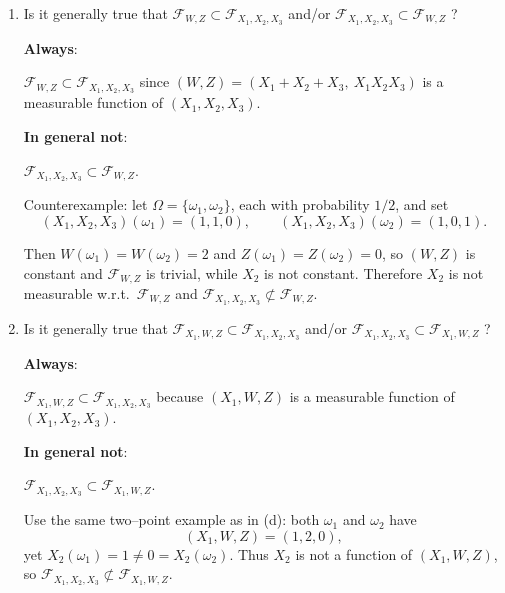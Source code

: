 \documentclass[dvipsnames,11pt]{article}
\begin{document}
\begin{enumerate}[label=\alph*.]
        \item Is it generally true that $\mathcal F_{W,Z}\subset \mathcal F_{X_1,X_2,X_3}$ and/or $\mathcal F_{X_1,X_2,X_3}\subset \mathcal F_{W,Z}$ ?
            
            \begin{solution}
    
                \textbf{Always}:
                
                $\mathcal F_{W,Z}\subset \mathcal F_{X_1,X_2,X_3}$ since $(W,Z)=(X_1+X_2+X_3,\ X_1X_2X_3)$ is a measurable function of $(X_1,X_2,X_3)$. 

                \textbf{In general not}:
                
                $\mathcal F_{X_1,X_2,X_3}\subset \mathcal F_{W,Z}$.  

                Counterexample: let $\Omega=\{\omega_1,\omega_2\}$, each with probability $1/2$, and set
                \[
                (X_1,X_2,X_3)(\omega_1)=(1,1,0),\qquad (X_1,X_2,X_3)(\omega_2)=(1,0,1).
                \]

                Then $W(\omega_1)=W(\omega_2)=2$ and $Z(\omega_1)=Z(\omega_2)=0$, so $(W,Z)$ is constant and $\mathcal F_{W,Z}$ is trivial, while $X_2$ is not constant. Therefore $X_2$ is not measurable w.r.t.\ $\mathcal F_{W,Z}$ and $\mathcal F_{X_1,X_2,X_3}\not\subset \mathcal F_{W,Z}$.

                
            \end{solution}
            
        \item Is it generally true that $\mathcal F_{X_1,W,Z}\subset \mathcal F_{X_1,X_2,X_3}$ and/or $\mathcal F_{X_1,X_2,X_3}\subset \mathcal F_{X_1,W,Z}$ ?
    
            \begin{solution}

                \textbf{Always}:
                
                $\mathcal F_{X_1,W,Z}\subset \mathcal F_{X_1,X_2,X_3}$ because $(X_1,W,Z)$ is a measurable function of $(X_1,X_2,X_3)$.

                \textbf{In general not}:
                
                $\mathcal F_{X_1,X_2,X_3}\subset \mathcal F_{X_1,W,Z}$.  
                
                Use the same two–point example as in (d): both $\omega_1$ and $\omega_2$ have
                \[
                (X_1,W,Z)=(1,2,0),
                \]
                yet $X_2(\omega_1)=1\neq 0=X_2(\omega_2)$. Thus $X_2$ is not a function of $(X_1,W,Z)$, so $\mathcal F_{X_1,X_2,X_3}\not\subset \mathcal F_{X_1,W,Z}$. 

            \end{solution}
            
    \end{enumerate}
\end{document}
